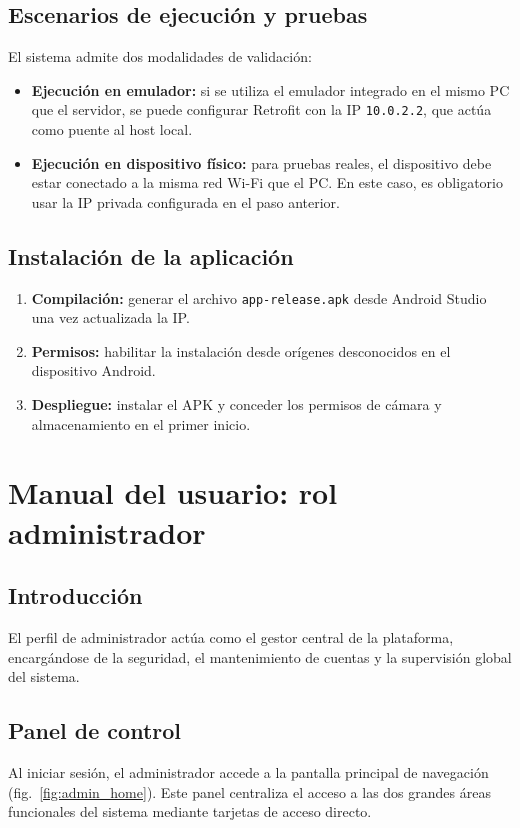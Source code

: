 \subsection{Escenarios de ejecución y pruebas}
El sistema admite dos modalidades de validación:
\begin{itemize}
    \item \textbf{Ejecución en emulador:} si se utiliza el emulador integrado en el mismo PC que el servidor, se puede configurar Retrofit con la IP \texttt{10.0.2.2}, que actúa como puente al host local.
    \item \textbf{Ejecución en dispositivo físico:} para pruebas reales, el dispositivo debe estar conectado a la misma red Wi-Fi que el PC. En este caso, es obligatorio usar la IP privada configurada en el paso anterior.
\end{itemize}

\subsection{Instalación de la aplicación}
\begin{enumerate}
    \item \textbf{Compilación:} generar el archivo \texttt{app-release.apk} desde Android Studio una vez actualizada la IP.
    \item \textbf{Permisos:} habilitar la instalación desde orígenes desconocidos en el dispositivo Android.
    \item \textbf{Despliegue:} instalar el APK y conceder los permisos de cámara y almacenamiento en el primer inicio.
\end{enumerate}

\section{Manual del usuario: rol administrador}

\subsection{Introducción}
El perfil de administrador actúa como el gestor central de la plataforma, encargándose de la seguridad, el mantenimiento de cuentas y la supervisión global del sistema.

\subsection{Panel de control}
Al iniciar sesión, el administrador accede a la pantalla principal de navegación (fig.~\ref{fig:admin_home}). Este panel centraliza el acceso a las dos grandes áreas funcionales del sistema mediante tarjetas de acceso directo.

